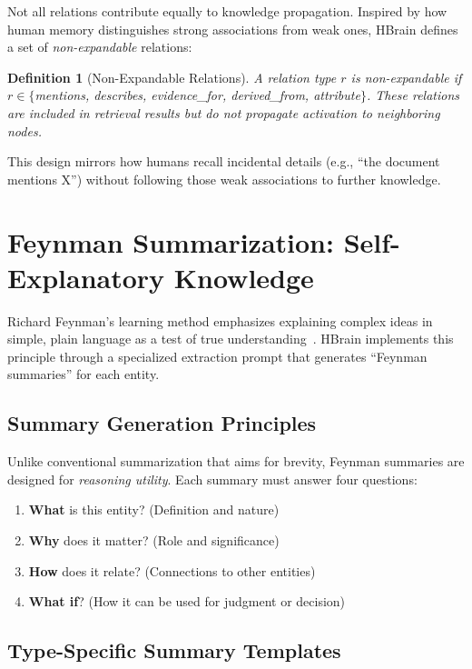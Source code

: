 \documentclass[11pt]{article}
\newtheorem{definition}{Definition}
\begin{document}
Not all relations contribute equally to knowledge propagation. Inspired by how human memory distinguishes strong associations from weak ones, HBrain defines a set of \textit{non-expandable} relations:

\begin{definition}[Non-Expandable Relations]
A relation type $r$ is non-expandable if $r \in \{$mentions, describes, evidence\_for, derived\_from, attribute$\}$. These relations are included in retrieval results but do not propagate activation to neighboring nodes.
\end{definition}

This design mirrors how humans recall incidental details (e.g., ``the document mentions X'') without following those weak associations to further knowledge.

\section{Feynman Summarization: Self-Explanatory Knowledge}
\label{sec:feynman}

Richard Feynman's learning method emphasizes explaining complex ideas in simple, plain language as a test of true understanding~\cite{feynman1988pleasure}. HBrain implements this principle through a specialized extraction prompt that generates ``Feynman summaries'' for each entity.

\subsection{Summary Generation Principles}

Unlike conventional summarization that aims for brevity, Feynman summaries are designed for \textit{reasoning utility}. Each summary must answer four questions:

\begin{enumerate}
    \item \textbf{What} is this entity? (Definition and nature)
    \item \textbf{Why} does it matter? (Role and significance)
    \item \textbf{How} does it relate? (Connections to other entities)
    \item \textbf{What if}? (How it can be used for judgment or decision)
\end{enumerate}

\subsection{Type-Specific Summary Templates}
\end{document}
